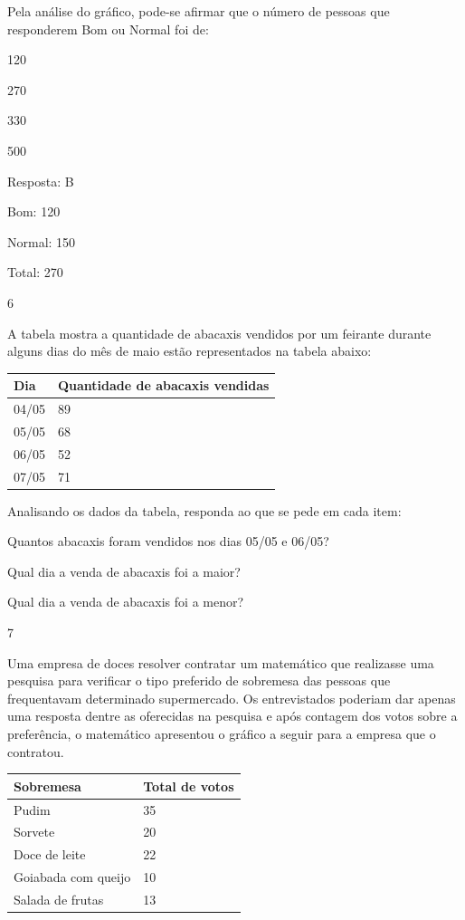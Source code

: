 \begin{escolha}
Pela análise do gráfico, pode-se afirmar que o número de pessoas que
responderem Bom ou Normal foi de:

\begin{escolha}
\item
  120
\item
  270
\item
  330
\item
  500
\end{escolha}

Resposta: B

Bom: 120

Normal: 150

Total: 270

\num{6}

A tabela mostra a quantidade de abacaxis vendidos por um feirante
durante alguns dias do mês de maio estão representados na tabela abaixo:

\begin{longtable}[]{@{}ll@{}}
\toprule
Dia & Quantidade de abacaxis vendidas\tabularnewline
\midrule
\endhead
04/05 & 89\tabularnewline
05/05 & 68\tabularnewline
06/05 & 52\tabularnewline
07/05 & 71\tabularnewline
\bottomrule
\end{longtable}

Analisando os dados da tabela, responda ao que se pede em cada item:

\begin{escolha}
  \item
  Quantos abacaxis foram vendidos nos dias 05/05 e 06/05?

\item
  Qual dia a venda de abacaxis foi a maior?

\item
  Qual dia a venda de abacaxis foi a menor?
\end{escolha}

\num{7}

Uma empresa de doces resolver contratar um matemático que realizasse uma
pesquisa para verificar o tipo preferido de sobremesa das pessoas que
frequentavam determinado supermercado. Os entrevistados poderiam dar
apenas uma resposta dentre as oferecidas na pesquisa e após contagem dos
votos sobre a preferência, o matemático apresentou o gráfico a seguir
para a empresa que o contratou.

\begin{longtable}[]{@{}ll@{}}
\toprule
Sobremesa & Total de votos\tabularnewline
\midrule
\endhead
Pudim & 35\tabularnewline
Sorvete & 20\tabularnewline
Doce de leite & 22\tabularnewline
Goiabada com queijo & 10\tabularnewline
Salada de frutas & 13\tabularnewline
\bottomrule
\end{longtable}


\end{escolha}
